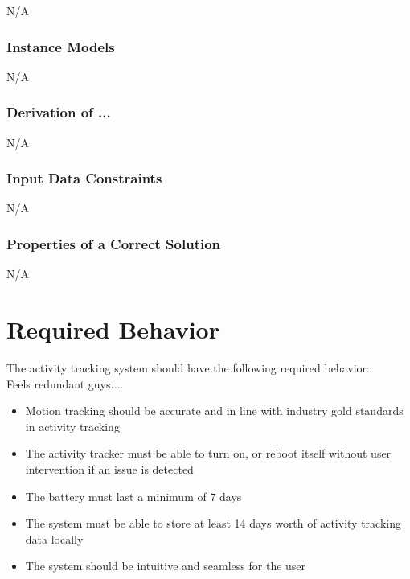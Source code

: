 \documentclass[12pt]{article}
\begin{document}
N/A



\subsubsection{Instance Models} \label{sec_instance}
N/A

\subsubsection*{Derivation of ...}
N/A

\subsubsection{Input Data Constraints} \label{sec_DataConstraints}
N/A


\subsubsection{Properties of a Correct Solution} \label{sec_CorrectSolution}
N/A


\section{Required Behavior}

The activity tracking system should have the following required behavior: \\
Feels redundant guys....

\begin{itemize}
\item Motion tracking should be accurate and in line with industry gold standards in activity tracking\\
\item The activity tracker must be able to turn on, or reboot itself without user intervention if an issue is detected\\
\item The battery must last a minimum of 7 days\\
\item The system must be able to store at least 14 days worth of activity tracking data locally\\
\item The system should be intuitive and seamless for the user\\
\end{itemize} 
\end{document}
